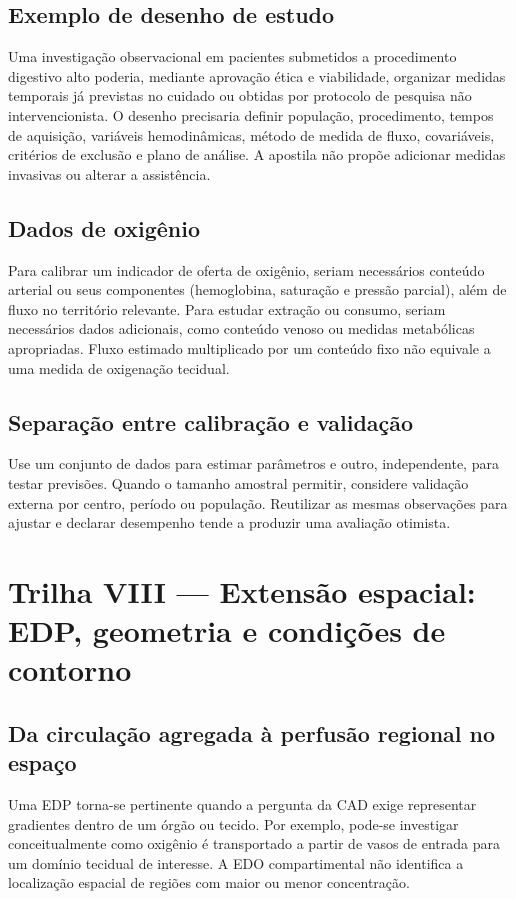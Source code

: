 \documentclass[11pt,a4paper,oneside]{book}
\begin{document}
\section{Exemplo de desenho de estudo}
Uma investigação observacional em pacientes submetidos a procedimento digestivo alto poderia, mediante aprovação ética e viabilidade, organizar medidas temporais já previstas no cuidado ou obtidas por protocolo de pesquisa não intervencionista. O desenho precisaria definir população, procedimento, tempos de aquisição, variáveis hemodinâmicas, método de medida de fluxo, covariáveis, critérios de exclusão e plano de análise. A apostila não propõe adicionar medidas invasivas ou alterar a assistência.

\section{Dados de oxigênio}
Para calibrar um indicador de oferta de oxigênio, seriam necessários conteúdo arterial ou seus componentes (hemoglobina, saturação e pressão parcial), além de fluxo no território relevante. Para estudar extração ou consumo, seriam necessários dados adicionais, como conteúdo venoso ou medidas metabólicas apropriadas. Fluxo estimado multiplicado por um conteúdo fixo não equivale a uma medida de oxigenação tecidual.

\section{Separação entre calibração e validação}
Use um conjunto de dados para estimar parâmetros e outro, independente, para testar previsões. Quando o tamanho amostral permitir, considere validação externa por centro, período ou população. Reutilizar as mesmas observações para ajustar e declarar desempenho tende a produzir uma avaliação otimista.

\chapter{Trilha VIII — Extensão espacial: EDP, geometria e condições de contorno}

\section{Da circulação agregada à perfusão regional no espaço}
Uma EDP torna-se pertinente quando a pergunta da CAD exige representar gradientes dentro de um órgão ou tecido. Por exemplo, pode-se investigar conceitualmente como oxigênio é transportado a partir de vasos de entrada para um domínio tecidual de interesse. A EDO compartimental não identifica a localização espacial de regiões com maior ou menor concentração.
\end{document}
